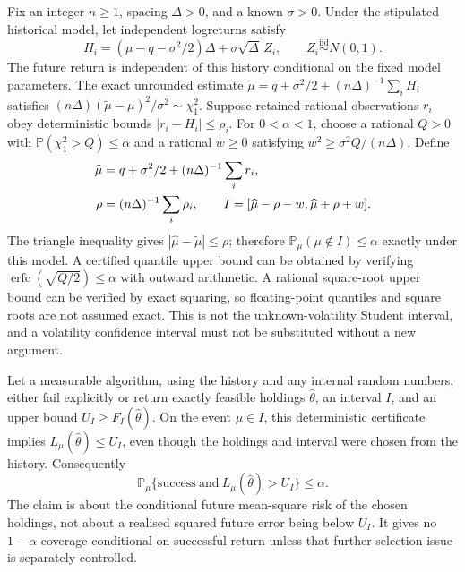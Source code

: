 \documentclass[11pt]{article}
\begin{document}
Fix an integer $n\geq1$, spacing $\Delta>0$, and a known $\sigma>0$.
Under the stipulated historical model, let independent logreturns satisfy
\begin{equation}
 H_i=(\mu-q-\sigma^2/2)\Delta+\sigma\sqrt\Delta\,Z_i,
 \qquad Z_i\stackrel{\mathrm{iid}}\sim N(0,1).
 \label{eq:h-drift-history}
\end{equation}
The future return is independent of this history conditional on the fixed
model parameters. The exact unrounded estimate
$\widetilde\mu=q+\sigma^2/2+(n\Delta)^{-1}\sum_iH_i$ satisfies
$(n\Delta)(\widetilde\mu-\mu)^2/\sigma^2\sim\chi^2_1$.
Suppose retained rational observations $r_i$ obey deterministic bounds
$|r_i-H_i|\leq\rho_i$. For $0<\alpha<1$, choose a rational $Q>0$ with
$\mathbb P(\chi^2_1>Q)\leq\alpha$ and a rational $w\geq0$ satisfying
$w^2\geq\sigma^2Q/(n\Delta)$. Define
\begin{align}
 \widehat\mu&=q+\sigma^2/2+(n\Delta)^{-1}\sum_i r_i,\notag\\
 \rho&=(n\Delta)^{-1}\sum_i\rho_i,\qquad
 I=[\widehat\mu-\rho-w,\widehat\mu+\rho+w].
 \label{eq:h-drift-rounded-ci}
\end{align}
The triangle inequality gives $|\widehat\mu-\widetilde\mu|\leq\rho$;
therefore $\mathbb P_\mu(\mu\notin I)\leq\alpha$ exactly under this model.
A certified quantile upper bound can be obtained by verifying
$\operatorname{erfc}(\sqrt{Q/2})\leq\alpha$ with outward arithmetic.
A rational square-root upper bound can be verified by exact squaring, so
floating-point quantiles and square roots are not assumed exact.
This is not the unknown-volatility Student interval, and a volatility
confidence interval must not be substituted without a new argument.

Let a measurable algorithm, using the history and any internal random
numbers, either fail explicitly or return exactly feasible holdings
$\widehat\theta$, an interval $I$, and an upper bound $U_I\geq F_I(\widehat\theta)$.
On the event $\mu\in I$, this deterministic certificate implies
$L_\mu(\widehat\theta)\leq U_I$, even though the holdings and interval
were chosen from the history. Consequently
\begin{equation}
 \mathbb P_\mu\{\mathrm{success}\ \text{and}\
 L_\mu(\widehat\theta)>U_I\}\leq\alpha.
 \label{eq:h-drift-joint-guarantee}
\end{equation}
The claim is about the conditional future mean-square risk of the
chosen holdings, not about a realised squared future error being below
$U_I$. It gives no $1-\alpha$ coverage conditional on successful return
unless that further selection issue is separately controlled.
\end{document}

